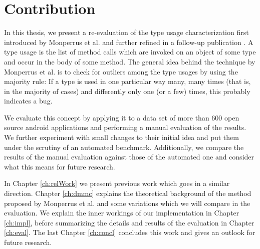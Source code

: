 \section{Contribution}

In this thesis, we present a re-evaluation of the type usage characterization first introduced by Monperrus et al. \cite{monperrus2010detecting} and further refined in a follow-up publication \cite{monperrus2013detecting}.
A type usage is the list of method calls which are invoked on an object of some type and occur in the body of some method.
The general idea behind the technique by Monperrus et al. is to check for outliers among the type usages by using the majority rule:
If a type is used in one particular way many, many times (that is, in the majority of cases) and differently only one (or a few) times, this probably indicates a bug.

We evaluate this concept by applying it to a data set of more than 600 open source android applications and performing a manual evaluation of the results.
We further experiment with small changes to their initial idea and put them under the scrutiny of an automated benchmark.
Additionally, we compare the results of the manual evaluation against those of the automated one and consider what this means for future research.

In Chapter \ref{ch:relWork} we present previous work which goes in a similar direction.
Chapter \ref{ch:dmmc} explains the theoretical background of the method proposed by Monperrus et al. and some variations which we will compare in the evaluation.
We explain the inner workings of our implementation in Chapter \ref{ch:impl}, before summarizing the details and results of the evaluation in Chapter \ref{ch:eval}.
The last Chapter \ref{ch:concl} concludes this work and gives an outlook for future research.


